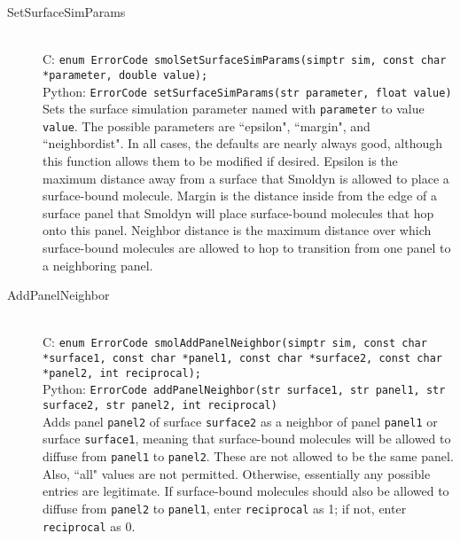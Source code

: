 \documentclass {book}
\begin{document}
\begin{description}
\item[SetSurfaceSimParams]
\hfill \\
C: \texttt{enum ErrorCode smolSetSurfaceSimParams(simptr sim, const char *parameter, double value);}\\
Python: \texttt{ErrorCode setSurfaceSimParams(str parameter, float value)}\\
Sets the surface simulation parameter named with \texttt{parameter} to value \texttt{value}. The possible parameters are ``epsilon", ``margin", and ``neighbordist". In all cases, the defaults are nearly always good, although this function allows them to be modified if desired. Epsilon is the maximum distance away from a surface that Smoldyn is allowed to place a surface-bound molecule. Margin is the distance inside from the edge of a surface panel that Smoldyn will place surface-bound molecules that hop onto this panel. Neighbor distance is the maximum distance over which surface-bound molecules are allowed to hop to transition from one panel to a neighboring panel.

\item[AddPanelNeighbor]
\hfill \\
C: \texttt{enum ErrorCode smolAddPanelNeighbor(simptr sim, const char *surface1, const char *panel1, const char *surface2, const char *panel2, int reciprocal);}\\
Python: \texttt{ErrorCode addPanelNeighbor(str surface1, str panel1, str surface2, str panel2, int reciprocal)}\\
Adds panel \texttt{panel2} of surface \texttt{surface2} as a neighbor of panel \texttt{panel1} or surface \texttt{surface1}, meaning that surface-bound molecules will be allowed to diffuse from \texttt{panel1} to \texttt{panel2}. These are not allowed to be the same panel. Also, ``all" values are not permitted. Otherwise, essentially any possible entries are legitimate. If surface-bound molecules should also be allowed to diffuse from \texttt{panel2} to \texttt{panel1}, enter \texttt{reciprocal} as 1; if not, enter \texttt{reciprocal} as 0.


\end{description}
\end{document}

